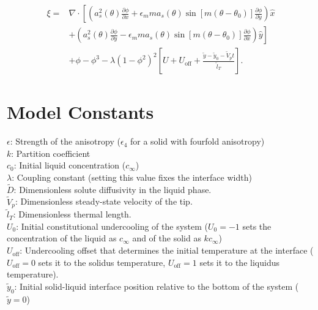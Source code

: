 \documentclass[10pt]{article}
\begin{document}
\begin{equation}
\label{eqxi2}
\begin{split}
\xi = & \nabla \cdot  \left[ \left(a_s^2(\theta) \frac{\partial \phi}{\partial x} + \epsilon_m m a_s(\theta) \sin \left[ m \left(\theta - \theta_0 \right) \right] \frac{\partial \phi}{\partial y}\right)\hat{x} \right. \\ 
& \left . + \left(a_s^2(\theta) \frac{\partial \phi}{\partial y} - \epsilon_m m a_s(\theta) \sin \left[ m \left(\theta - \theta_0 \right) \right] \frac{\partial \phi}{\partial x}\right)\hat{y}\right] \\
&+ \phi-\phi^3 - \lambda(1-\phi^2)^2 \left[ U + U_\text{off} + \frac{\tilde{y} - \tilde{y}_0 - \tilde{V}_p t}{\tilde{l}_T} \right].
\end{split}
\end{equation}

\section{Model Constants}
$\epsilon$: Strength of the anisotropy ($\epsilon_4$ for a solid with fourfold anisotropy)\\
$k$: Partition coefficient \\
$c_0$: Initial liquid concentration ($c_\infty$)\\
$\lambda$: Coupling constant (setting this value fixes the interface width) \\
$\tilde{D}$: Dimensionless solute diffusivity in the liquid phase. \\
$\tilde{V}_p$: Dimensionless steady-state velocity of the tip. \\
$\tilde{l}_T$: Dimensionless thermal length. \\
$U_0$: Initial constitutional undercooling of the system ($U_0=-1$ sets the concentration of the liquid as $c_\infty$ and of the solid as $kc_\infty$)\\
$U_{\text{off}}$: Undercooling offset that determines the initial temperature at the interface ($U_{\text{off}}=0$ sets it to the solidus temperature,  $U_{\text{off}}=1$ sets it to the liquidus temperature).\\
$\tilde{y}_0$: Initial solid-liquid interface position relative to the bottom of the system ($\tilde{y}=0$) \\
\end{document}
